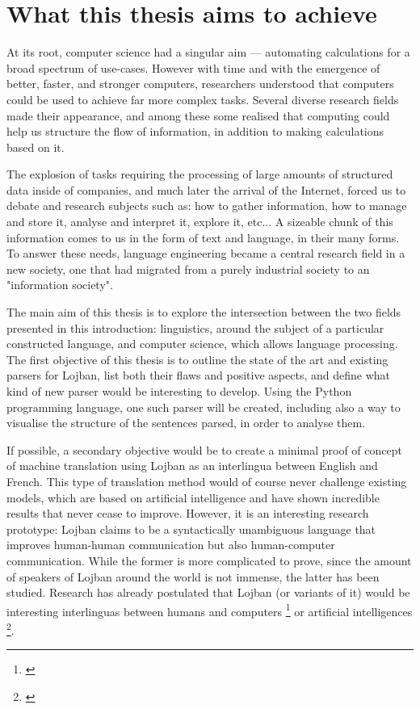 \section{What this thesis aims to achieve}

At its root, computer science had a singular aim --- automating calculations for a broad spectrum of use-cases. However with time and with the emergence of better, faster, and
stronger computers, researchers understood that computers could be used to achieve far more complex tasks. Several diverse research fields made their appearance, and among these
some realised that computing could help us structure the flow of information, in addition to making calculations based on it. \newline

The explosion of tasks requiring the processing of large amounts of structured data inside of companies, and much later the arrival of the Internet, forced us to debate and
research subjects such as: how to gather information, how to manage and store it, analyse and interpret it, explore it, etc... A sizeable chunk of this information comes to us
in the form of text and language, in their many forms. To answer these needs, language engineering became a central research field in a new society, one that had migrated
from a purely industrial society to an "information society".\newline

The main aim of this thesis is to explore the intersection between the two fields presented in this introduction: linguistics, around the subject of a particular constructed
language, and computer science, which allows language processing. The first objective of this thesis is to outline the state of the art and existing parsers for Lojban, list both
their flaws and positive aspects, and define what kind of new parser would be interesting to develop. Using the Python programming language, one such parser will be created, including
also a way to visualise the structure of the sentences parsed, in order to analyse them.\newline

If possible, a secondary objective would be to create a minimal proof of concept of machine translation using Lojban as an interlingua between English and French. This type of translation
method would of course never challenge existing models, which are based on artificial intelligence and have shown incredible results that never cease to improve. However, it is an interesting
research prototype: Lojban claims to be a syntactically unambiguous language that improves human-human communication but also human-computer communication. While the former is more complicated
to prove, since the amount of speakers of Lojban around the world is not immense, the latter has been studied. Research has already postulated that Lojban (or variants of it) would be interesting
interlinguas between humans and computers \footnote{\cite{speer2004meeting}} or artificial intelligences \footnote{\cite{goertzel2013lojban}}.
